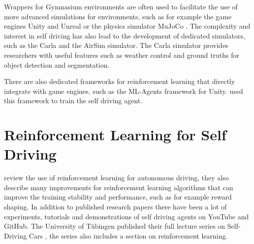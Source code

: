 Wrappers for Gymnasium environments are often used to facilitate the use of more advanced simulations for environments, such as for example the game engines Unity and Unreal or the physics simulator MuJoCo \autocite{mujoco}. The complexity and interest in self driving has also lead to the development of dedicated simulators, such as the Carla \autocite{carla} and the AirSim \autocite{airsim} simulator. The Carla simulator provides researchers with useful features such as weather control and ground truths for object detection and segmentation.

There are also dedicated frameworks for reinforcement learning that directly integrate with game engines, such as the ML-Agents framework \autocite{mlagents} for Unity.\autocite{maximilian} used this framework to train the self driving agent.



\section{Reinforcement Learning for Self Driving}

\autocite{drl_for_ad} review the use of reinforcement learning for autonomous driving, they also describe many improvements for reinforcement learning algorithms that can improve the training stability and performance, such as for example reward shaping.
In addition to published research papers there have been a lot of experiments, tutorials and demonstrations of self driving agents on YouTube and GitHub. The University of Tübingen published their full lecture series on Self-Driving Cars \autocite{tuebingen}, the series also includes a section on reinforcement learning.









